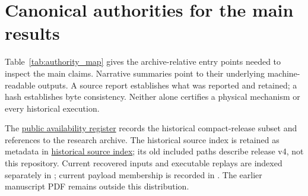 \section{Canonical authorities for the main results}

Table~\ref{tab:authority_map} gives the archive-relative entry points needed to inspect the main claims. Narrative summaries point to their underlying machine-readable outputs. A source report establishes what was reported and retained; a hash establishes byte consistency. Neither alone certifies a physical mechanism or every historical execution.

The \href{https://github.com/Drefetr/An_Evaluation_of_Earthquake_Models/blob/61aa599cd023f2441a6a0c6af9aa4b6fe9eda3e5/paper/supplements/source_availability.json}{public availability register} records the historical compact-release subset and references to the research archive. The historical source index is retained as metadata in \href{https://github.com/Drefetr/An_Evaluation_of_Earthquake_Models/blob/61aa599cd023f2441a6a0c6af9aa4b6fe9eda3e5/provenance/historical_v4_source_index.json}{historical source index}; its old included paths describe release v4, not this repository. Current recovered inputs and executable replays are indexed separately in ; current payload membership is recorded in . The earlier manuscript PDF remains outside this distribution.

